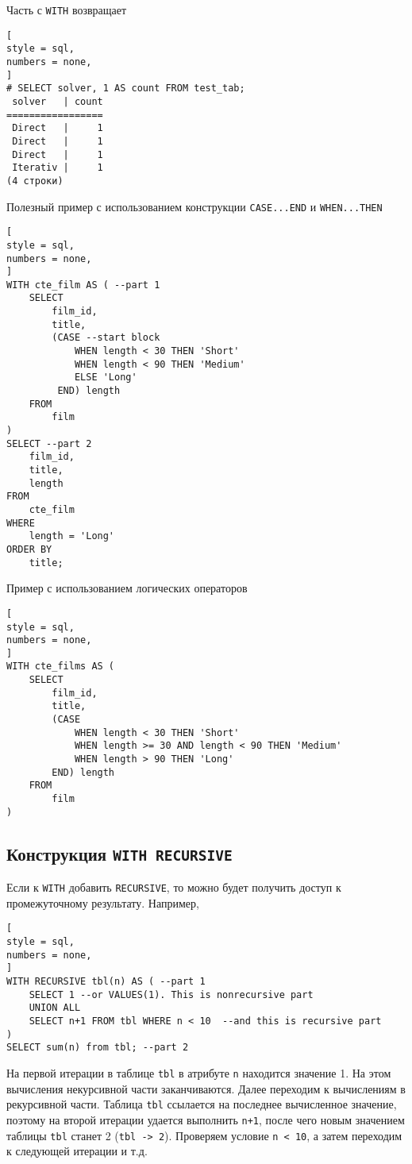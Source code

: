 \documentclass[%
	11pt,
	a4paper,
	utf8,
		]{article}
\begin{document}
Часть с \texttt{WITH} возвращает

\begin{lstlisting}[
style = sql,
numbers = none,
]
# SELECT solver, 1 AS count FROM test_tab;
 solver   | count
=================
 Direct   |     1
 Direct   |     1
 Direct   |     1
 Iterativ |     1
(4 строки)
\end{lstlisting}

Полезный пример с использованием конструкции \lstinline{CASE...END} и \lstinline{WHEN...THEN}

\begin{lstlisting}[
style = sql,
numbers = none,
]
WITH cte_film AS ( --part 1
    SELECT
        film_id,
        title,
        (CASE --start block
            WHEN length < 30 THEN 'Short'
            WHEN length < 90 THEN 'Medium'
            ELSE 'Long'
         END) length
    FROM
        film
)
SELECT --part 2
    film_id,
    title,
    length
FROM
    cte_film
WHERE
    length = 'Long'
ORDER BY
    title;
\end{lstlisting}

Пример с использованием логических операторов

\begin{lstlisting}[
style = sql,
numbers = none,
]
WITH cte_films AS (
    SELECT
        film_id,
        title,
        (CASE
            WHEN length < 30 THEN 'Short'
            WHEN length >= 30 AND length < 90 THEN 'Medium'
            WHEN length > 90 THEN 'Long'
        END) length
    FROM
        film
)

\end{lstlisting}

\subsection{Конструкция \texttt{WITH RECURSIVE}}

Если к \texttt{WITH} добавить \texttt{RECURSIVE}, то можно будет получить доступ к промежуточному результату. Например,

\begin{lstlisting}[
style = sql,
numbers = none,
]
WITH RECURSIVE tbl(n) AS ( --part 1
    SELECT 1 --or VALUES(1). This is nonrecursive part
    UNION ALL
    SELECT n+1 FROM tbl WHERE n < 10  --and this is recursive part
)
SELECT sum(n) from tbl; --part 2
\end{lstlisting}

На первой итерации в таблице \texttt{tbl} в атрибуте \texttt{n} находится значение 1. На этом вычисления некурсивной части заканчиваются. Далее переходим к вычислениям в рекурсивной части. Таблица \texttt{tbl} ссылается на последнее вычисленное значение, поэтому на второй итерации удается выполнить \texttt{n+1}, после чего новым значением таблицы \texttt{tbl} станет 2 (\lstinline{tbl -> 2}). Проверяем условие \lstinline{n < 10}, а затем переходим к следующей итерации и т.д.
\end{document}
